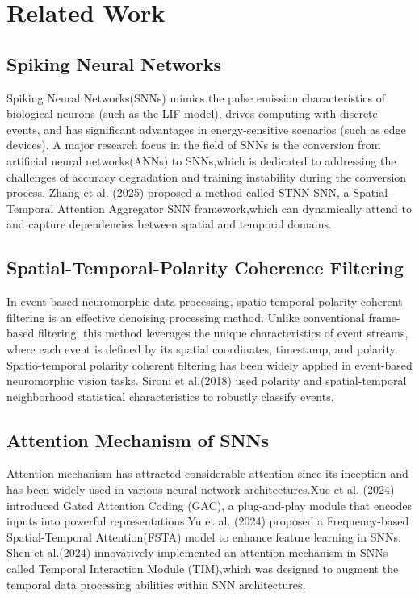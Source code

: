 \documentclass[conference]{IEEEtran}
\begin{document}
\section{Related Work}
\subsection{Spiking Neural Networks}
Spiking Neural Networks(SNNs) mimics the pulse emission characteristics of biological neurons (such as the LIF model), drives computing with discrete events, and has significant advantages in energy-sensitive scenarios (such as edge devices).\cite{roy2019towards} A major research focus in the field of SNNs is the conversion from artificial neural networks(ANNs) to SNNs\cite{rueckauer2017conversion},which is dedicated to addressing the challenges of accuracy degradation and training instability during the conversion process.\cite{han2020rmp} Zhang et al. (2025) proposed a method called STNN-SNN, a Spatial-Temporal Attention Aggregator SNN framework,which can dynamically attend to and capture dependencies between spatial and temporal domains.\cite{zhang2025}

\subsection{Spatial-Temporal-Polarity Coherence Filtering}
In event-based neuromorphic data processing, spatio-temporal polarity coherent filtering is an effective denoising processing method. Unlike conventional frame-based filtering, this method leverages the unique characteristics of event streams, where each event is defined by its spatial coordinates, timestamp, and polarity. Spatio-temporal polarity coherent filtering has been widely applied in event-based neuromorphic vision tasks. Sironi et al.(2018) used polarity and spatial-temporal neighborhood statistical characteristics to robustly classify events.\cite{8578284} 

\subsection{Attention Mechanism of SNNs}
Attention mechanism has attracted considerable attention since its inception and has been widely used in various neural network architectures.Xue et al. (2024) introduced Gated Attention Coding (GAC)\cite{qiu2024}, a plug-and-play module that encodes inputs into powerful representations.Yu et al. (2024) proposed a Frequency-based Spatial-Temporal Attention(FSTA) model to enhance feature learning in SNNs.\cite{yu2025}  Shen et al.(2024) innovatively implemented an attention mechanism in SNNs called Temporal Interaction Module (TIM),which was designed to augment the temporal data processing abilities within SNN architectures.\cite{shen2024}
\end{document}
